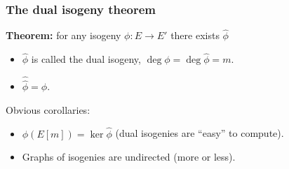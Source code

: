 \documentclass{beamer}
\begin{document}

\begin{frame}
  \frametitle{The dual isogeny theorem}

  \textbf{Theorem:} for any isogeny \emph{$\phi:E \to E'$} there exists
  \emph{$\hat\phi$}
  
  \begin{center}
  \end{center}

  \begin{itemize}
  \item \emph{$\hat\phi$} is called the \alert{dual isogeny},
    \emph{$\deg \phi = \deg \hat{\phi} = m$}.
  \item \emph{$\hat{\hat{\phi}} = \phi$}.
  \end{itemize}
  
  \begin{block}{Obvious corollaries:}
    \begin{itemize}
    \item \emph{$\phi(E[m]) = \ker\hat\phi$} (dual isogenies are ``easy'' to compute).
    \item Graphs of isogenies are \alert{undirected} (more or less).
    \end{itemize}
  \end{block}
\end{frame}

\end{document}
